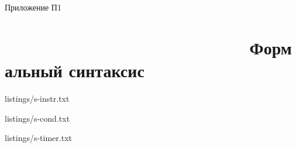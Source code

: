 \begin{flushleft}
	Приложение П1
\end{flushleft}
\setcounter{secnumdepth}{0}
\section[Приложение П1. Формальный синтаксис]{                          Формальный синтаксис}


\renewcommand{\thelstlisting}{П1.\arabic{lstlisting}}
\setcounter{lstlisting}{0}


{listings/s-instr.txt}


{listings/s-cond.txt}


{listings/s-timer.txt}
